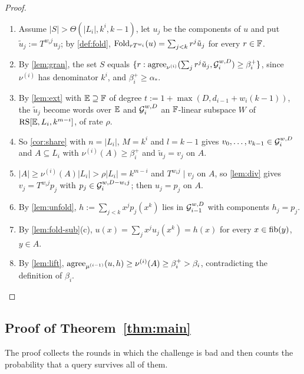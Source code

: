 \begin{proof}
\begin{enumerate}
\item Assume $|S|>\Theta(|L_i|,k^i,k-1)$, let $u_j$ be the components of $u$ and put
$\tilde u_j:=T^{w_ij}u_j$; by \cref{def:fold}, $\mathrm{Fold}_{rT^{w_i}}(u)=\sum_{j<k}r^j\tilde u_j$ for
every $r\in\mathbb{F}$.
\item By \cref{lem:gran}, the set $S$ equals
$\{r:\mathrm{agree}_{\nu^{(i)}}(\sum_jr^j\tilde u_j,\mathcal{G}_i^{w,D})\ge\beta_i^+\}$, since $\nu^{(i)}$ has
denominator $k^i$, and $\beta_i^+\ge\alpha_*$.
\item By \cref{lem:ext} with $\mathbb{E}\supseteq\mathbb{F}$ of degree $t:=1+\max(D,d_{i-1}+w_i(k-1))$, the
$\tilde u_j$ become words over $\mathbb{E}$ and $\mathcal{G}_i^{w,D}$ an $\mathbb{F}$-linear subspace $W$ of
$\mathrm{RS}[\mathbb{E},L_i,k^{m-i}]$, of rate $\rho$.
\item So \cref{cor:share} with $n=|L_i|$, $M=k^i$ and $l=k-1$ gives $v_0,\dots,v_{k-1}\in\mathcal{G}_i^{w,D}$
and $A\subseteq L_i$ with $\nu^{(i)}(A)\ge\beta_i^+$ and $\tilde u_j=v_j$ on $A$.
\item $|A|\ge\nu^{(i)}(A)|L_i|>\rho|L_i|=k^{m-i}$ and $T^{w_ij}\mid v_j$ on $A$, so \cref{lem:div}
gives $v_j=T^{w_ij}p_j$ with $p_j\in\mathcal{G}_i^{w,D-w_ij}$; then $u_j=p_j$ on $A$.
\item By \cref{lem:unfold}, $h:=\sum_{j<k}x^jp_j(x^k)$ lies in $\mathcal{G}_{i-1}^{w,D}$ with components
$h_j=p_j$.
\item By \cref{lem:fold-sub}(c), $u(x)=\sum_jx^ju_j(x^k)=h(x)$ for every $x\in\mathrm{fib}(y)$, $y\in A$.
\item By \cref{lem:lift}, $\mathrm{agree}_{\mu^{(i-1)}}(u,h)\ge\nu^{(i)}(A)\ge\beta_i^+>\beta_i$,
contradicting the definition of $\beta_i$.
\end{enumerate}
\end{proof}

\subsection{Proof of \texorpdfstring{Theorem~\ref{thm:main}}{the main theorem}}\label{sec:proof-main}

The proof collects the rounds in which the challenge is bad and then counts the probability that a
query survives all of them.

